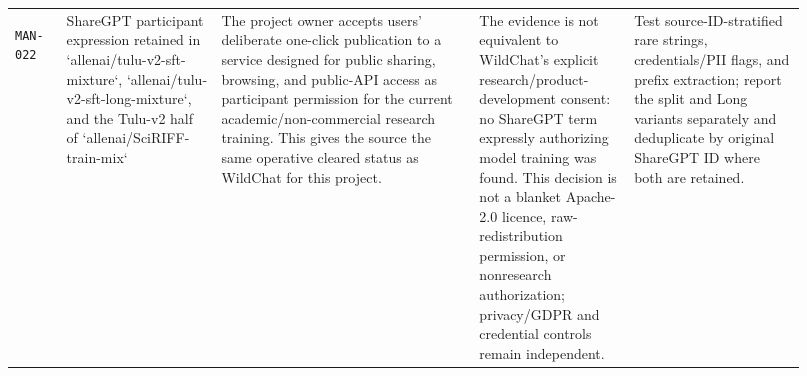 \documentclass[9pt,a4paper]{article}
\newcommand{\manid}[1]{\hypertarget{manual:#1}{\texttt{#1}}}
\begin{document}
\begin{landscape}
\begin{longtable}{@{}L{0.06\linewidth}L{0.18\linewidth}L{0.30\linewidth}L{0.18\linewidth}L{0.20\linewidth}@{}}
\manid{MAN-022} & ShareGPT participant expression retained in `allenai/tulu-v2-sft-mixture`, `allenai/tulu-v2-sft-long-mixture`, and the Tulu-v2 half of `allenai/SciRIFF-train-mix` & The project owner accepts users' deliberate one-click publication to a service designed for public sharing, browsing, and public-API access as participant permission for the current academic/non-commercial research training. This gives the source the same operative cleared status as WildChat for this project. & The evidence is not equivalent to WildChat's explicit research/product-development consent: no ShareGPT term expressly authorizing model training was found. This decision is not a blanket Apache-2.0 licence, raw-redistribution permission, or nonresearch authorization; privacy/GDPR and credential controls remain independent. & Test source-ID-stratified rare strings, credentials/PII flags, and prefix extraction; report the split and Long variants separately and deduplicate by original ShareGPT ID where both are retained. \\
\end{longtable}
\end{landscape}
\end{document}
